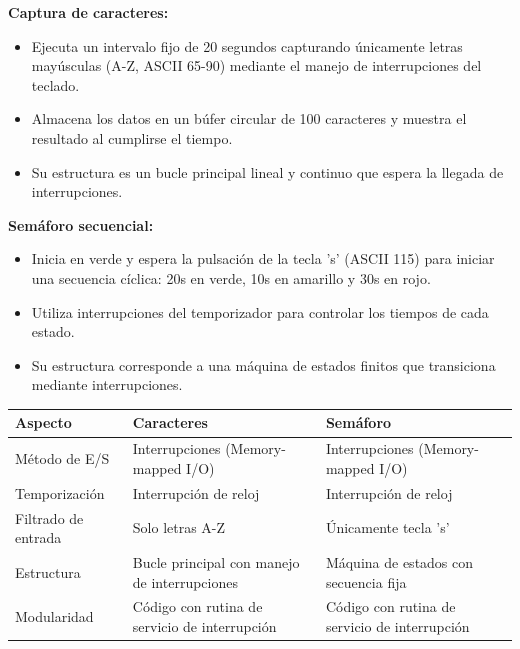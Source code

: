 \documentclass[12pt]{article}
\begin{document}
\vspace{0.2cm}

\textbf{Captura de caracteres:}

\begin{itemize}
    \item Ejecuta un intervalo fijo de 20 segundos capturando únicamente letras mayúsculas (A-Z, ASCII 65-90) mediante el manejo de interrupciones del teclado.
    \item Almacena los datos en un búfer circular de 100 caracteres y muestra el resultado al cumplirse el tiempo.
    \item Su estructura es un bucle principal lineal y continuo que espera la llegada de interrupciones.
\end{itemize}

\vspace{0.2cm}

\textbf{Semáforo secuencial:}

\begin{itemize}
    \item Inicia en verde y espera la pulsación de la tecla 's' (ASCII 115) para iniciar una secuencia cíclica: 20s en verde, 10s en amarillo y 30s en rojo.
    \item Utiliza interrupciones del temporizador para controlar los tiempos de cada estado.
    \item Su estructura corresponde a una máquina de estados finitos que transiciona mediante interrupciones.
\end{itemize}

\vspace{0.3cm}

\begin{center}
\begin{tabular}{|p{3cm}|p{4.5cm}|p{4.5cm}|}
\hline
\textbf{Aspecto} & \textbf{Caracteres} & \textbf{Semáforo} \\ \hline
Método de E/S & Interrupciones (Memory-mapped I/O) & Interrupciones (Memory-mapped I/O) \\ \hline
Temporización & Interrupción de reloj & Interrupción de reloj \\ \hline
Filtrado de entrada & Solo letras A-Z & Únicamente tecla 's' \\ \hline
Estructura & Bucle principal con manejo de interrupciones & Máquina de estados con secuencia fija \\ \hline
Modularidad & Código con rutina de servicio de interrupción & Código con rutina de servicio de interrupción \\ \hline
\end{tabular}
\end{center}
\end{document}
